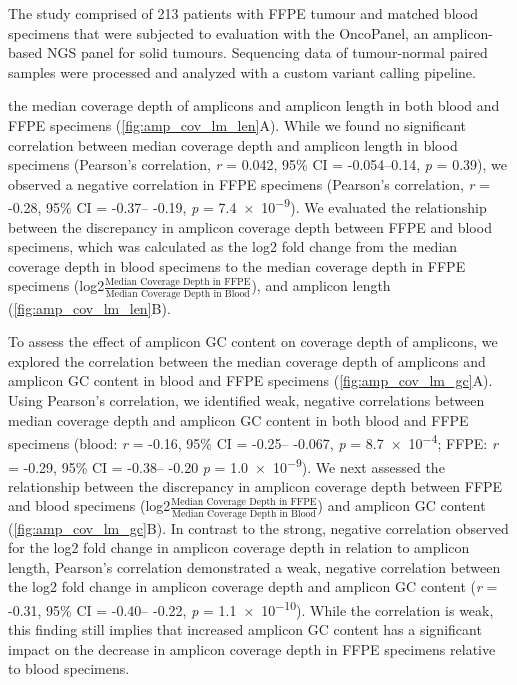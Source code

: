 
The study comprised of 213 patients with FFPE tumour and matched blood specimens that were subjected to evaluation with the OncoPanel, an amplicon-based NGS panel for solid tumours. Sequencing data of tumour-normal paired samples were processed and analyzed with a custom variant calling pipeline.

the median coverage depth of amplicons and amplicon length in both blood and FFPE specimens (\autoref{fig:amp_cov_lm_len}A). While we found no significant correlation between median coverage depth and amplicon length in blood specimens (Pearson's correlation, \textit{r} = 0.042, 95\% CI = -0.054--0.14, \textit{p} = 0.39), we observed a negative correlation in FFPE specimens (Pearson's correlation, \textit{r} = -0.28, 95\% CI = -0.37-- -0.19, \textit{p} = \num{7.4e-9}). We evaluated the relationship between the discrepancy in amplicon coverage depth between FFPE and blood specimens, which was calculated as the log2 fold change from the median coverage depth in blood specimens to the median coverage depth in FFPE specimens (log2\( \frac{\text{Median Coverage Depth in FFPE}}{\text{Median Coverage Depth in Blood}} \)), and amplicon length (\autoref{fig:amp_cov_lm_len}B).

To assess the effect of amplicon GC content on coverage depth of amplicons, we explored the correlation between the median coverage depth of amplicons and amplicon GC content in blood and FFPE specimens (\autoref{fig:amp_cov_lm_gc}A). Using Pearson's correlation, we identified weak, negative correlations between median coverage depth and amplicon GC content in both blood and FFPE specimens (blood: \textit{r} = -0.16, 95\% CI = -0.25-- -0.067, \textit{p} = \num{8.7e-4}; FFPE: \textit{r} = -0.29, 95\% CI = -0.38-- -0.20 \textit{p} = \num{1.0e-9}). We next assessed the relationship between the discrepancy in amplicon coverage depth between FFPE and blood specimens (log2\( \frac{\text{Median Coverage Depth in FFPE}}{\text{Median Coverage Depth in Blood}} \)) and amplicon GC content (\autoref{fig:amp_cov_lm_gc}B). In contrast to the strong, negative correlation observed for the log2 fold change in amplicon coverage depth in relation to amplicon length, Pearson's correlation demonstrated a weak, negative correlation between the log2 fold change in amplicon coverage depth and amplicon GC content (\textit{r} = -0.31, 95\% CI = -0.40-- -0.22, \textit{p} = \num{1.1e-10}). While the correlation is weak, this finding still implies that increased amplicon GC content has a significant impact on the decrease in amplicon coverage depth in FFPE specimens relative to blood specimens.

